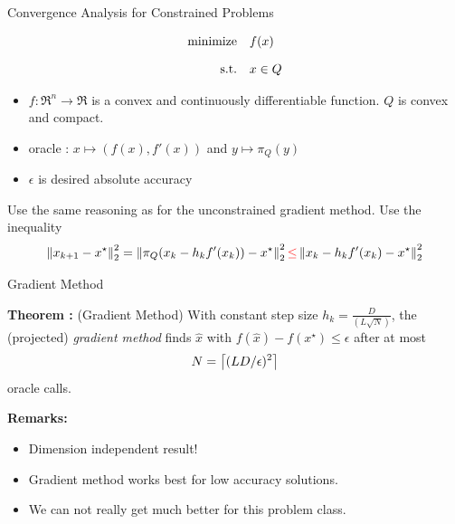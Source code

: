 \documentclass[9pt]{beamer}
\begin{document}
\begin{frame}{Convergence Analysis for Constrained Problems} 

  \begin{minipage}{0.4\textwidth}
    \begin{equation*}
      \begin{array}{rl}
        \operatorname{minimize} & f(x) \\[1em]
        \mathrm{s.t.} & x \in Q
      \end{array}
    \end{equation*}
  \end{minipage}%
  \hfill
  \begin{minipage}{0.55\textwidth}
    \begin{itemize}
    \item $f:\Re^n\to\Re$ is a convex and continuously differentiable function. $Q$ is convex and compact.
    \item oracle : $x\mapsto (f(x), f'(x))$ and $y \mapsto \pi_Q(y)$
    \item $\epsilon$ is desired absolute accuracy
    \end{itemize}
  \end{minipage}

  \vfill
  
  Use the same reasoning as for the unconstrained gradient method. Use the inequality
  \[
    \left\|x_{k+1}-x^\star\right\|^2_2 = \left\|\pi_{Q}(x_k-h_k f'(x_k)) - x^\star\right\|^2_2 {\color{red} \leq} \left\|x_k-h_k f'(x_k) - x^\star\right\|^2_2
  \]
  
\end{frame}

\begin{frame}{Gradient Method}

  \textbf{Theorem :} (Gradient Method)
  With constant step size $h_k = \tfrac{D}{(L\sqrt N)}$, the (projected) \emph{gradient method} finds $\hat x$ with $f(\hat x)-f(x^\star)\leq\epsilon$ after at most
  \[
    N = \left\lceil({L D}/{\epsilon})^2\right\rceil
  \]
  oracle calls.

  \vfill

  \textbf{Remarks:}
  \begin{itemize}
  \item Dimension independent result!
  \item Gradient method works best for low accuracy solutions.
  \item We can not really get much better for this problem class.
  \end{itemize}
  
\end{frame}
\end{document}
